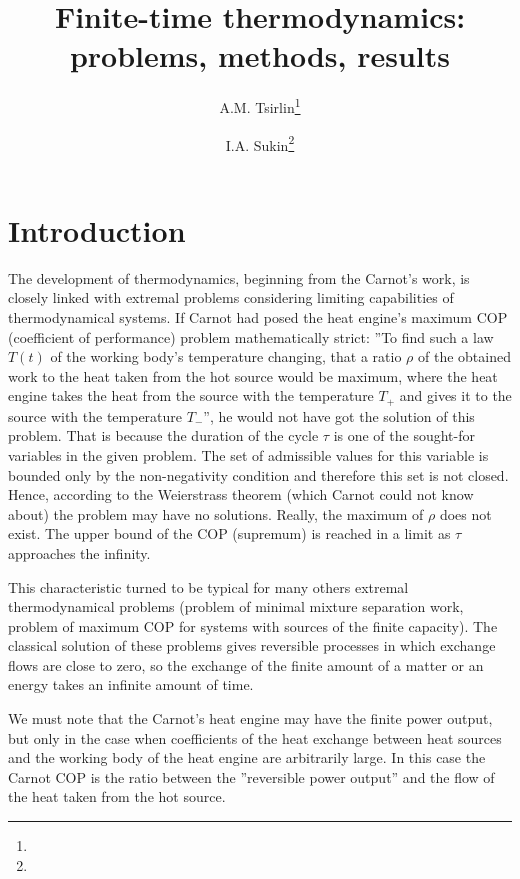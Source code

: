 \documentclass[epjST]{svjour}
\begin{document}
%
\title{Finite-time thermodynamics: problems, methods, results}
\author{A.M. Tsirlin\fnmsep\thanks{} \and I.A. Sukin\fnmsep\thanks{} }
%
%
%
\maketitle
%
\section{Introduction}
\label{intro}
The development of thermodynamics, beginning from the Carnot’s work, is closely linked with extremal problems considering limiting capabilities of thermodynamical systems. If Carnot had posed the heat engine’s maximum COP (coefficient of performance) problem mathematically strict: ''To find such a law $T(t)$ of the working body’s temperature changing, that a ratio $\rho$ of the obtained work to the heat taken from the hot source would be maximum, where the heat engine takes the heat from the source with the temperature $T_+$ and gives it to the source with the temperature $T_-$'', he would not have got the solution of this problem. That is because the duration of the cycle $\tau$ is one of the sought-for variables in the given problem. The set of admissible values for this variable is bounded only by the non-negativity condition and therefore this set is not closed. Hence, according to the Weierstrass theorem (which Carnot could not know about) the problem may have no solutions. Really, the maximum of $\rho$ does not exist. The upper bound of the COP (supremum) is reached in a limit as $\tau$ approaches the infinity.

This characteristic turned to be typical for many others extremal thermodynamical problems (problem of minimal mixture separation work, problem of maximum COP for systems with sources of the finite capacity). The classical solution of these problems gives reversible processes in which exchange flows are close to zero, so the exchange of the finite amount of a matter or an energy takes an infinite amount of time.

We must note that the Carnot's heat engine may have the finite power output, but only in the case when coefficients of the heat exchange between heat sources and the working body of the heat engine are arbitrarily large. In this case the Carnot COP is the ratio between the ''reversible power output'' and the flow of the heat taken from the hot source.
\end{document}
